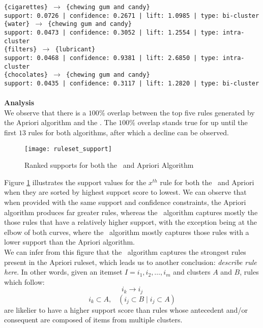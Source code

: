 \texttt{\{cigarettes\} $\rightarrow$ \{chewing gum and candy\}}\\\texttt{support: 0.0726 | confidence: 0.2671 | lift: 1.0985 | type: bi-cluster}\\
\texttt{\{water\} $\rightarrow$ \{chewing gum and candy\}}\\\texttt{support: 0.0473 | confidence: 0.3052 | lift: 1.2554 | type: intra-cluster}\\
\texttt{\{filters\} $\rightarrow$ \{lubricant\}}\\\texttt{support: 0.0468 | confidence: 0.9381 | lift: 2.6850 | type: intra-cluster}\\
\texttt{\{chocolates\} $\rightarrow$ \{chewing gum and candy\}}\\\texttt{support: 0.0435 | confidence: 0.3117 | lift: 1.2820 | type: bi-cluster}\\
\\\textbf{Analysis}\\
We observe that there is a $100\%$ overlap between the top five rules generated by the Apriori algorithm and the \algo. The $100\%$ overlap stands true for up until the first $13$ rules for both algorithms, after which a decline can be observed. 
\begin{figure}[H]
\centering
\texttt{[image: ruleset\_support]}
\caption{Ranked supports for both the \algo\ and Apriori Algorithm}
\label{fig:rule_support}
\end{figure}
Figure \ref{fig:rule_support} illustrates the support values for the $x^{th}$ rule for both the \algo\ and Apriori when they are sorted by highest support score to lowest. 
We can observe that when provided with the same support and confidence constraints, the Apriori algorithm produces far greater rules, whereas the \algo\ algorithm captures mostly the those rules that have a relatively higher support, with the exception being at the elbow of both curves, where the \algo\ algorithm mostly captures those rules with a lower support than the Apriori algorithm.\\
We can infer from this figure that the \algo\ algorithm captures the strongest rules present in the Apriori ruleset, which leads us to another conclusion: \textit{describe rule here}. In other words, given an itemset $I = i_1,i_2,\dots,i_m$ and clusters $A$ and $B$, rules which follow:
\[
i_k \rightarrow i_j
\]
\[
i_k \subset A, \;\;\; (i_j \subset B \;|\; i_j \subset A)
\]
are likelier to have a higher support score than rules whose antecedent and/or consequent are composed of items from multiple clusters.


